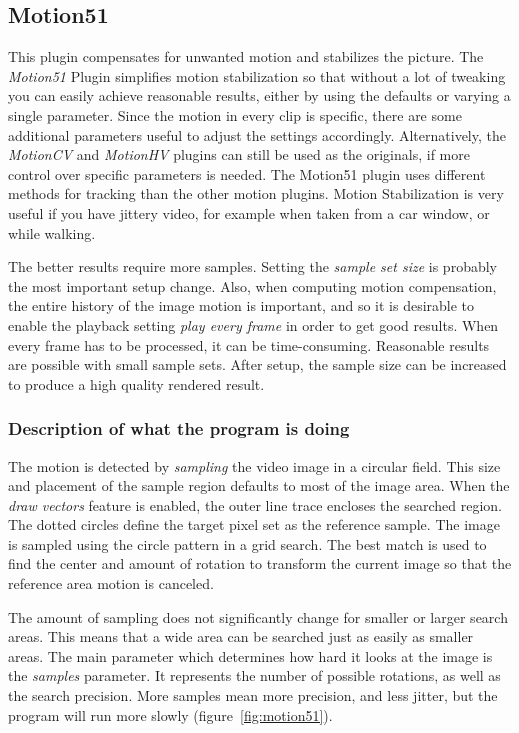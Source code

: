 \subsection{Motion51}%
\label{sub:motion51}

This plugin compensates for unwanted motion and stabilizes the picture. The \textit{Motion51} Plugin simplifies motion stabilization so that without a lot of tweaking you can easily achieve reasonable results, either by using the defaults or varying a single parameter. Since the motion in every clip is specific, there are some additional parameters useful to adjust the settings accordingly. Alternatively, the \textit{MotionCV} and \textit{MotionHV} plugins can still be used as the originals, if more control over specific parameters is needed. The Motion51 plugin uses different methods for tracking than the other motion plugins. Motion Stabilization is very useful if you have jittery video, for example when taken from a car window, or while walking.

The better results require more samples. Setting the \textit{sample set size} is probably the most important setup change. Also, when computing motion compensation, the entire history of the image motion is important, and so it is desirable to enable the playback setting \textit{play every frame} in order to get good results. When every frame has to be processed, it can be time-consuming. Reasonable results are possible with small sample sets. After setup, the sample size can be increased to produce a high quality rendered result.

\subsubsection*{Description of what the program is doing}
\label{ssub:description_program_doing}

The motion is detected by \textit{sampling} the video image in a circular field. This size and placement of the sample region defaults to most of the image area. When the \textit{draw vectors} feature is enabled, the outer line trace encloses the searched region. The dotted circles define the target pixel set as the reference sample. The image is sampled using the circle pattern in a grid search. The best match is used to find the center and amount of rotation to transform the current image so that the reference area motion is canceled.

The amount of sampling does not significantly change for smaller or larger search areas. This means that a wide area can be searched just as easily as smaller areas. The main parameter which determines how hard it looks at the image is the \textit{samples} parameter. It represents the number of possible rotations, as well as the search precision. More samples mean more precision, and less jitter, but the program will run more slowly (figure~\ref{fig:motion51}).

